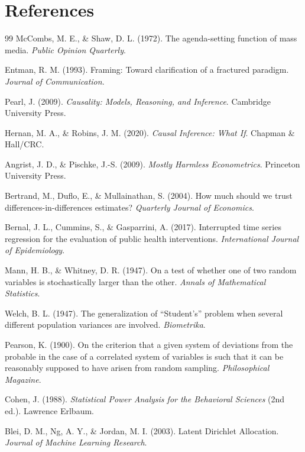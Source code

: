\documentclass[12pt]{article}
\begin{document}
\section{References}
\begin{thebibliography}{99}
McCombs, M. E., \& Shaw, D. L. (1972). The agenda-setting function of mass media. \emph{Public Opinion Quarterly}.

Entman, R. M. (1993). Framing: Toward clarification of a fractured paradigm. \emph{Journal of Communication}.

Pearl, J. (2009). \emph{Causality: Models, Reasoning, and Inference}. Cambridge University Press.

Hernan, M. A., \& Robins, J. M. (2020). \emph{Causal Inference: What If}. Chapman \& Hall/CRC.

Angrist, J. D., \& Pischke, J.-S. (2009). \emph{Mostly Harmless Econometrics}. Princeton University Press.

Bertrand, M., Duflo, E., \& Mullainathan, S. (2004). How much should we trust differences-in-differences estimates? \emph{Quarterly Journal of Economics}.

Bernal, J. L., Cummins, S., \& Gasparrini, A. (2017). Interrupted time series regression for the evaluation of public health interventions. \emph{International Journal of Epidemiology}.

Mann, H. B., \& Whitney, D. R. (1947). On a test of whether one of two random variables is stochastically larger than the other. \emph{Annals of Mathematical Statistics}.

Welch, B. L. (1947). The generalization of ``Student's'' problem when several different population variances are involved. \emph{Biometrika}.

Pearson, K. (1900). On the criterion that a given system of deviations from the probable in the case of a correlated system of variables is such that it can be reasonably supposed to have arisen from random sampling. \emph{Philosophical Magazine}.

Cohen, J. (1988). \emph{Statistical Power Analysis for the Behavioral Sciences} (2nd ed.). Lawrence Erlbaum.

Blei, D. M., Ng, A. Y., \& Jordan, M. I. (2003). Latent Dirichlet Allocation. \emph{Journal of Machine Learning Research}.


\end{thebibliography}
\end{document}
